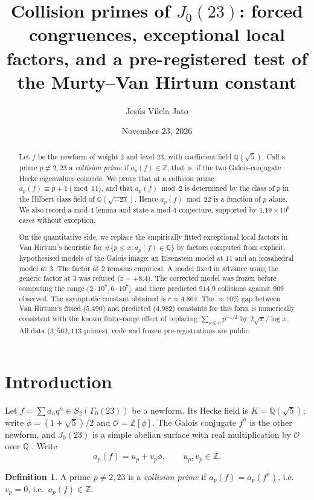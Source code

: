 \documentclass[11pt]{amsart}
\title[Collision primes of $J_0(23)$]{Collision primes of $J_0(23)$: forced congruences, exceptional local factors, and a pre-registered test of the Murty--Van Hirtum constant}
\author{Jes\'us Vilela Jato}
\date{November 23, 2026}
\theoremstyle{definition}
\newtheorem{definition}[theorem]{Definition}
\theoremstyle{remark}
\newcommand{\Q}{\mathbb{Q}}
\newcommand{\Z}{\mathbb{Z}}
\newcommand{\cO}{\mathcal{O}}
\begin{document}
\begin{abstract}
Let $f$ be the newform of weight $2$ and level $23$, with coefficient field $\Q(\sqrt5)$. Call a prime $p\neq 2,23$ a \emph{collision prime} if $a_p(f)\in\Z$, that is, if the two Galois-conjugate Hecke eigenvalues coincide. We prove that at a collision prime $a_p(f)\equiv p+1\pmod{11}$, and that $a_p(f)\bmod 2$ is determined by the class of $p$ in the Hilbert class field of $\Q(\sqrt{-23})$. Hence $a_p(f)\bmod 22$ is a function of $p$ alone. We also record a mod-$4$ lemma and state a mod-$4$ conjecture, supported by $1.19\times10^6$ cases without exception.

On the quantitative side, we replace the empirically fitted exceptional local factors in Van Hirtum's heuristic for $\#\{p\le x: a_p(f)\in\Q\}$ by factors computed from explicit, hypothesised models of the Galois image: an Eisenstein model at $11$ and an icosahedral model at $3$. The factor at $2$ remains empirical. A model fixed in advance using the generic factor at $3$ was refuted ($z=+8.4$). The corrected model was frozen before computing the range $(2\cdot10^7,6\cdot10^7]$, and there predicted $914.9$ collisions against $909$ observed. The asymptotic constant obtained is $c\approx4.864$. The $\approx10\%$ gap between Van Hirtum's fitted ($5.490$) and predicted ($4.982$) constants for this form is numerically consistent with the known finite-range effect of replacing $\sum_{p\le x}p^{-1/2}$ by $2\sqrt x/\log x$. All data ($3{,}562{,}113$ primes), code and frozen pre-registrations are public.
\end{abstract}

\maketitle

\section{Introduction}

Let $f=\sum a_nq^n\in S_2(\Gamma_0(23))$ be a newform. Its Hecke field is $K=\Q(\sqrt5)$; write $\phi=(1+\sqrt5)/2$ and $\cO=\Z[\phi]$. The Galois conjugate $f^\sigma$ is the other newform, and $J_0(23)$ is a simple abelian surface with real multiplication by $\cO$ over $\Q$ \cite{Hashimoto,LMFDB}. Write
\[
a_p(f)=u_p+v_p\phi,\qquad u_p,v_p\in\Z .
\]

\begin{definition}
A prime $p\neq2,23$ is a \emph{collision prime} if $a_p(f)=a_p(f^\sigma)$, i.e.\ $v_p=0$, i.e.\ $a_p(f)\in\Z$.
\end{definition}
\end{document}
